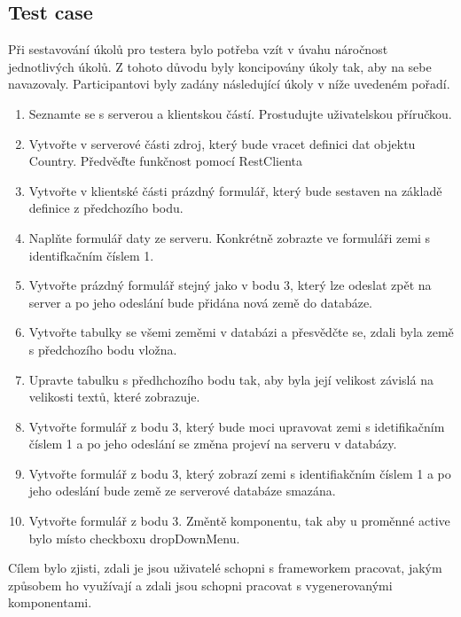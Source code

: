 \subsection{Test case}
Při sestavování úkolů pro testera bylo potřeba vzít v úvahu náročnost jednotlivých úkolů. Z tohoto důvodu byly koncipovány úkoly tak, aby na sebe navazovaly. Participantovi byly zadány následující úkoly v níže uvedeném pořadí.
\begin{enumerate}
\item Seznamte se s serverou a klientskou částí. Prostudujte uživatelskou příručkou.
\item Vytvořte v serverové části zdroj, který bude vracet definici dat objektu Country. Předvěďte funkčnost pomocí RestClienta
\item Vytvořte v klientské části prázdný formulář, který bude sestaven na základě definice z předchozího bodu.
\item Naplňte formulář daty ze serveru. Konkrétně zobrazte ve formuláři zemi s identifkačním číslem 1.
\item Vytvořte prázdný formulář stejný jako v bodu 3, který lze odeslat zpět na server a po jeho odeslání bude přidána nová země do databáze.
\item Vytvořte tabulky se všemi zeměmi v databázi a přesvědčte se, zdali byla země s předchozího bodu vložna.
\item Upravte tabulku s předhchozího bodu tak, aby byla její velikost závislá na velikosti textů, které zobrazuje.
\item Vytvořte formulář z bodu 3, který bude moci upravovat zemi s idetifikačním číslem 1 a po jeho odeslání se změna projeví na serveru v databázy.
\item Vytvořte formulář z bodu 3, který zobrazí zemi s identifiakčním číslem 1 a po jeho odeslání bude země ze serverové databáze smazána.
\item Vytvořte formulář z bodu 3. Změntě komponentu, tak aby u proměnné active bylo místo checkboxu dropDownMenu.
\end{enumerate}
Cílem bylo zjisti, zdali je jsou uživatelé schopni s frameworkem pracovat, jakým způsobem ho využívají a zdali jsou schopni pracovat s vygenerovanými komponentami.
